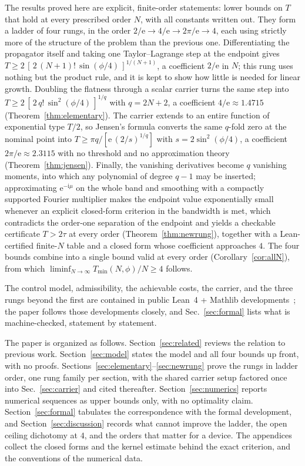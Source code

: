 \documentclass[%
  aps,
  pra,
  preprint,
  superscriptaddress,
  amsmath,amssymb,
  nofootinbib,
  floatfix,
]{revtex4-2}
\theoremstyle{definition}
\theoremstyle{remark}
\newcommand{\e}{\mathrm e}
\begin{document}
The results proved here are explicit, finite-order statements: lower bounds on $T$ that hold
at every prescribed order $N$, with all constants written out. They form a ladder of four
rungs, in the order $2/\e\to4/\e\to2\pi/\e\to4$, each using strictly more of the structure of
the problem than the previous one. Differentiating the propagator itself and taking one
Taylor--Lagrange step at the endpoint gives
$T\ge2\,[\,2\,(N+1)!\,\sin(\phi/4)\,]^{1/(N+1)}$, a coefficient $2/\e$ in $N$; this rung uses
nothing but the product rule, and it is kept to show how little is needed for linear growth.
Doubling the flatness through a scalar carrier turns the same step into
$T\ge2\,[\,2\,q!\,\sin^{2}(\phi/4)\,]^{1/q}$ with $q=2N+2$, a coefficient
$4/\e\approx1.4715$ (Theorem~\ref{thm:elementary}). The carrier extends to an entire function
of exponential type $T/2$, so Jensen's formula converts the same $q$-fold zero at the nominal
point into $T\ge\pi q/[\e\,(2/s)^{1/q}]$ with $s=2\sin^{2}(\phi/4)$, a coefficient
$2\pi/\e\approx2.3115$ with no threshold and no approximation theory
(Theorem~\ref{thm:jensen}). Finally, the vanishing derivatives become $q$ vanishing moments,
into which any polynomial of degree $q-1$ may be inserted; approximating $\e^{-\mathrm{i}\mu}$
on the whole band and smoothing with a compactly supported Fourier multiplier makes the
endpoint value exponentially small whenever an explicit closed-form criterion in the bandwidth
is met, which contradicts the order-one separation of the endpoint and yields a checkable
certificate $T>2\tau$ at every order (Theorem~\ref{thm:newrung}), together with a
Lean-certified finite-$N$ table and a closed form whose coefficient approaches $4$. The four
bounds combine into a single bound valid at every order (Corollary~\ref{cor:allN}), from which
$\liminf_{N\to\infty}T_{\min}(N,\phi)/N\ge4$ follows.

The control model, admissibility, the achievable costs, the carrier, and the three rungs beyond
the first are contained in public Lean~4 + Mathlib developments~\cite{LeanRepo}; the paper
follows those developments closely, and Sec.~\ref{sec:formal} lists what is machine-checked,
statement by statement.

The paper is organized as follows. Section~\ref{sec:related} reviews the relation to previous
work. Section~\ref{sec:model} states the model and all four bounds up front, with no proofs.
Sections~\ref{sec:elementary}--\ref{sec:newrung} prove the rungs in ladder order, one rung
family per section, with the shared carrier setup factored once into Sec.~\ref{sec:carrier} and
cited thereafter. Section~\ref{sec:numerics} reports numerical sequences as upper bounds only,
with no optimality claim. Section~\ref{sec:formal} tabulates the correspondence with the formal
development, and Section~\ref{sec:discussion} records what cannot improve the ladder, the open
ceiling dichotomy at $4$, and the orders that matter for a device. The appendices collect the
closed forms and the kernel estimate behind the exact criterion, and the conventions of the
numerical data.
\end{document}
